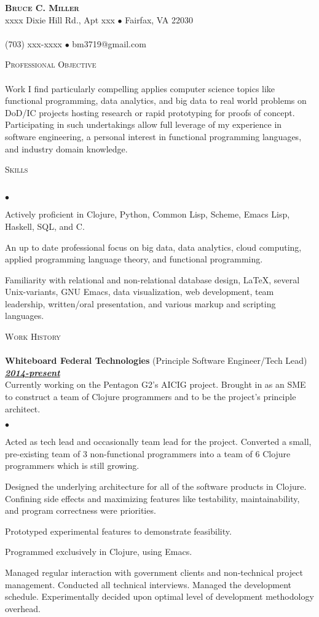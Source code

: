 \documentclass{article}
\newcommand{\lineunder}{\vspace*{-8pt} \\ \hspace*{-18pt} \hrulefill \\}
\newcommand{\header}[1]{{\hspace*{-15pt}\vspace*{7pt} \textsc{#1}} \vspace*{-7pt} \lineunder}
\newcommand{\employer}[3]{{ \textbf{#1} (#2)\\ \underline{\textbf{\emph{#3}}}\\  }}
\newcommand{\contact}[3]{
\vspace*{-8pt}
\begin{center}
{\LARGE \scshape {#1}}\\
#2 \lineunder
#3
\end{center}
\vspace*{-8pt}
}
\newenvironment{achievements}{\begin{list}{$\bullet$}{\topsep 0pt \itemsep
      -2pt}}{\vspace*{4pt}\end{list}}
\begin{document}
\small
\smallskip
\vspace*{-44pt}

\contact{\textbf{Bruce C. Miller}}
{xxxx Dixie Hill Rd., Apt xxx $\bullet$ Fairfax, VA 22030}
{(703) xxx-xxxx $\bullet$ bm3719@gmail.com}

\header{Professional Objective} Work I find particularly compelling applies
computer science topics like functional programming, data analytics, and big
data to real world problems on DoD/IC projects hosting research or rapid
prototyping for proofs of concept.  Participating in such undertakings allow
full leverage of my experience in software engineering, a personal interest in
functional programming languages, and industry domain knowledge.  \vspace{7pt}

\header{Skills}
\begin{achievements}
\item Actively proficient in Clojure, Python, Common Lisp, Scheme, Emacs Lisp,
  Haskell, SQL, and C.
\item An up to date professional focus on big data, data analytics, cloud
  computing, applied programming language theory, and functional programming.
\item Familiarity with relational and non-relational database design, \LaTeX,
  several Unix-variants, GNU Emacs, data visualization, web development, team
  leadership, written/oral presentation, and various markup and scripting
  languages.
\end{achievements}

\header{Work History}

\employer{Whiteboard Federal Technologies}{Principle Software Engineer/Tech
  Lead}{2014-present} Currently working on the Pentagon G2's AICIG project.
Brought in as an SME to construct a team of Clojure programmers and to be the
project's principle architect.
\begin{achievements}
\item Acted as tech lead and occasionally team lead for the project.  Converted
  a small, pre-existing team of 3 non-functional programmers into a team of 6
  Clojure programmers which is still growing.
\item Designed the underlying architecture for all of the software products in
  Clojure.  Confining side effects and maximizing features like testability,
  maintainability, and program correctness were priorities.
\item Prototyped experimental features to demonstrate feasibility.
\item Programmed exclusively in Clojure, using Emacs.
\item Managed regular interaction with government clients and non-technical
  project management.  Conducted all technical interviews.  Managed the
  development schedule.  Experimentally decided upon optimal level of
  development methodology overhead.
\end{achievements}
\end{document}
